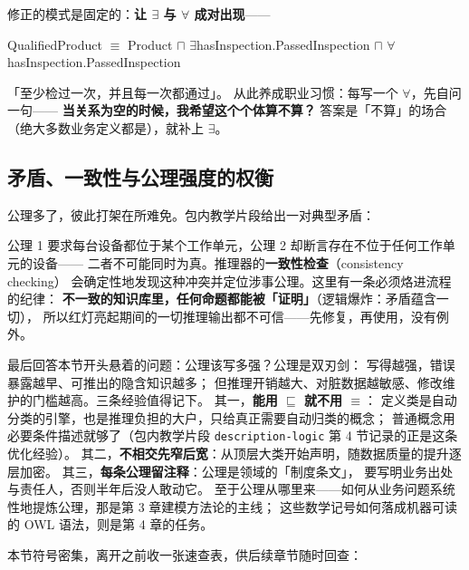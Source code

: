 修正的模式是固定的：\textbf{让 \(\exists\) 与 \(\forall\) 成对出现}——

\begin{noteblock}
\centering
QualifiedProduct \(\equiv\) Product \(\sqcap\)
\(\exists\)hasInspection.PassedInspection \(\sqcap\)
\(\forall\)hasInspection.PassedInspection
\end{noteblock}

「至少检过一次，并且每一次都通过」。
从此养成职业习惯：每写一个 \(\forall\)，先自问一句——
\textbf{当关系为空的时候，我希望这个个体算不算？}
答案是「不算」的场合（绝大多数业务定义都是），就补上 \(\exists\)。

\subsection{矛盾、一致性与公理强度的权衡}

公理多了，彼此打架在所难免。包内教学片段给出一对典型矛盾：



公理 1 要求每台设备都位于某个工作单元，公理 2 却断言存在不位于任何工作单元的设备——
二者不可能同时为真。推理器的\textbf{一致性检查}（consistency checking）
会确定性地发现这种冲突并定位涉事公理。这里有一条必须烙进流程的纪律：
\textbf{不一致的知识库里，任何命题都能被「证明」}（逻辑爆炸：矛盾蕴含一切），
所以红灯亮起期间的一切推理输出都不可信——先修复，再使用，没有例外。

最后回答本节开头悬着的问题：公理该写多强？公理是双刃剑：
写得越强，错误暴露越早、可推出的隐含知识越多；
但推理开销越大、对脏数据越敏感、修改维护的门槛越高。三条经验值得记下。
其一，\textbf{能用 \(\sqsubseteq\) 就不用 \(\equiv\)}：
定义类是自动分类的引擎，也是推理负担的大户，只给真正需要自动归类的概念；
普通概念用必要条件描述就够了（包内教学片段 \texttt{description-logic}
第 4 节记录的正是这条优化经验）。
其二，\textbf{不相交先窄后宽}：从顶层大类开始声明，随数据质量的提升逐层加密。
其三，\textbf{每条公理留注释}：公理是领域的「制度条文」，
要写明业务出处与责任人，否则半年后没人敢动它。
至于公理从哪里来——如何从业务问题系统性地提炼公理，那是第 3 章建模方法论的主线；
这些数学记号如何落成机器可读的 OWL 语法，则是第 4 章的任务。

本节符号密集，离开之前收一张速查表，供后续章节随时回查：

